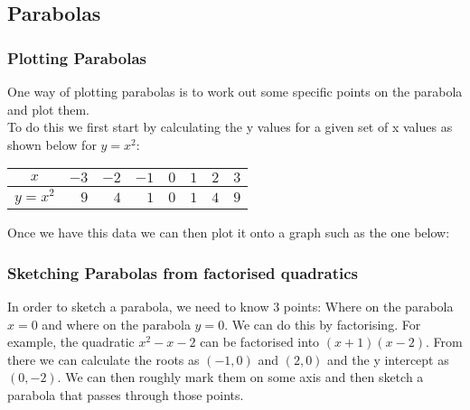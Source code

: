 \documentclass{article}
\begin{document}
\subsection{Parabolas}

\subsubsection{Plotting Parabolas}
One way of plotting parabolas is to work out some specific points on the parabola and plot them.
\\
To do this we first start by calculating the y values for a given set of x values as shown below for
$y = x^2$:
\begin{center}
	\begin{tabular}{ | c | r | r | r | c | c | c | c | }
		\hline
		$x$ & $-3$ & $-2$ & $-1$ & $0$ & $1$ & $2$ & $3$\\ \hline
		$y=x^2$ &$9$ & $4$ & $1$ & $0$ & $1$ & $4$ & $9$\\
		\hline
	\end{tabular}
\end{center}
Once we have this data we can then plot it onto a graph such as the one below:
\begin{center}
\end{center}
\subsubsection{Sketching Parabolas from factorised quadratics}
In order to sketch a parabola, we need to know 3 points: Where on the parabola $x=0$ and 
where on the parabola $y=0$. We can do this by factorising. For example, the quadratic
$x^2 - x - 2$ can be factorised into $(x+1)(x-2)$. From there we can calculate the roots as
$(-1, 0)$ and $(2, 0)$ and the y intercept as $(0, -2)$. We can then roughly mark them on
some axis and then sketch a parabola that passes through those points.

\begin{center}
\end{center}
\end{document}

